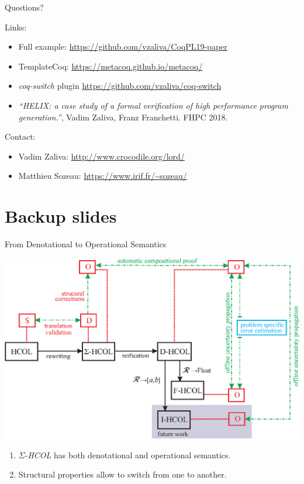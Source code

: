 \documentclass[aspectratio=169]{beamer}
\newcommand{\SHCOL}{\texorpdfstring{$\Sigma$-\emph{HCOL}}{Sigma-HCOL}}
\begin{document}
\begin{frame}{Questions?}

  Links:
  
  \begin{itemize}
  \item Full example: \url{https://github.com/vzaliva/CoqPL19-paper}
  \item TemplateCoq:
    \url{https://metacoq.github.io/metacoq/}
  \item \emph{coq-switch} plugin \url{https://github.com/vzaliva/coq-switch}
  \item \textit{``HELIX: a case
    study of a formal verification of high performance program
    generation.''}, Vadim Zaliva, Franz Franchetti. FHPC 2018. 
  \end{itemize}

  Contact:

  \begin{itemize}
  \item Vadim Zaliva: \url{http://www.crocodile.org/lord/}
  \item Matthieu Sozeau: \url{https://www.irif.fr/~sozeau/}
  \end{itemize}  
  
\end{frame}

\section{Backup slides}

\begin{frame}{From Denotational to Operational Semantics}
  \begin{center}
    \includegraphics[width=0.8\columnwidth]{figures/semantics.eps}
  \end{center}
  
  \begin{enumerate}
  \item {\SHCOL} has both denotational and operational semantics.
  \item Structural properties allow to switch from one to another.
  \end{enumerate}


\end{frame}
\end{document}
